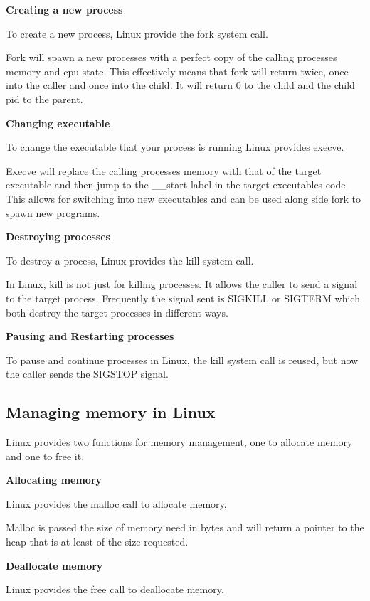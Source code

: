 \documentclass[a4paper]{report}
\begin{document}
\noindent
\textbf{Creating a new process}

To create a new process, Linux provide the fork system call. \cite{manFork}

Fork will spawn a new processes with a perfect copy of the calling processes memory and cpu state. This effectively means that fork will return twice, once into the caller and once into the child. It will return 0 to the child and the child pid to the parent.

\noindent
\textbf{Changing executable}

To change the executable that your process is running Linux provides execve. \cite{manExecve}

Execve will replace the calling processes memory with that of the target executable and then jump to the \_\_start label in the target executables code. This allows for switching into new executables and can be used along side fork to spawn new programs.

\noindent
\textbf{Destroying processes}

To destroy a process, Linux provides the kill system call. \cite{manKill}

In Linux, kill is not just for killing processes. It allows the caller to send a signal to the target process. Frequently the signal sent is SIGKILL or SIGTERM which both destroy the target processes in different ways.

\noindent
\textbf{Pausing and Restarting processes}

To pause and continue processes in Linux, the kill system call is reused, but now the caller sends the SIGSTOP signal.

\subsection{Managing memory in Linux}

Linux provides two functions for memory management, one to allocate memory and one to free it.

\noindent
\textbf{Allocating memory}

Linux provides the malloc call to allocate memory. \cite{manMalloc}

Malloc is passed the size of memory need in bytes and will return a pointer to the heap that is at least of the size requested.

\noindent
\textbf{Deallocate memory}

Linux provides the free call to deallocate memory.
\end{document}
